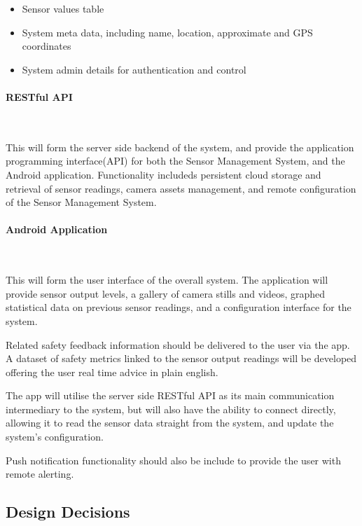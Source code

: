 \documentclass{article}
\begin{document}
\begin{itemize}
  \item Sensor values table
  \item System meta data, including name, location, approximate and GPS coordinates 
  \item System admin details for authentication and control
\end{itemize}

\paragraph{RESTful API}\

This will form the server side backend of the system, and provide the application programming interface(API) for both the Sensor Management System, and the Android application. Functionality includeds persistent cloud storage and retrieval of sensor readings, camera assets management, and remote configuration of the Sensor Management System.

\paragraph{Android Application}\

This will form the user interface of the overall system. The application will provide sensor output levels, a gallery of camera stills and videos, graphed statistical data on previous sensor readings, and a configuration interface for the system.\

Related safety feedback information should be delivered to the user via the app. A dataset of safety metrics linked to the sensor output readings will be developed offering the user real time advice in plain english.\

The app will utilise the server side RESTful API as its main communication intermediary to the system, but will also have the ability to connect directly, allowing it to read the sensor data straight from the system, and update the system’s configuration. \

Push notification functionality should also be include to provide the user with remote alerting.

\subsection{Design Decisions}
\end{document}
